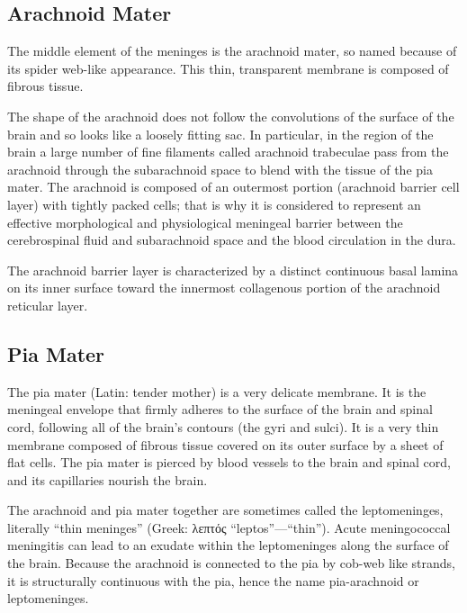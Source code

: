 \hypertarget{arachnoid-mater}{%
\subsection{Arachnoid Mater}\label{arachnoid-mater}}

The middle element of the meninges is the arachnoid mater, so named because of its spider web-like appearance. This thin, transparent membrane is composed of fibrous tissue.

The shape of the arachnoid does not follow the convolutions of the surface of the brain and so looks like a loosely fitting sac. In particular, in the region of the brain a large number of fine filaments called arachnoid trabeculae pass from the arachnoid through the subarachnoid space to blend with the tissue of the pia mater. The arachnoid is composed of an outermost portion (arachnoid barrier cell layer) with tightly packed cells; that is why it is considered to represent an effective morphological and physiological meningeal barrier between the cerebrospinal fluid and subarachnoid space and the blood circulation in the dura.

The arachnoid barrier layer is characterized by a distinct continuous basal lamina on its inner surface toward the innermost collagenous portion of the arachnoid reticular layer.

\hypertarget{pia-mater}{%
\subsection{Pia Mater}\label{pia-mater}}

The pia mater (Latin: tender mother) is a very delicate membrane. It is the meningeal envelope that firmly adheres to the surface of the brain and spinal cord, following all of the brain's contours (the gyri and sulci). It is a very thin membrane composed of fibrous tissue covered on its outer surface by a sheet of flat cells. The pia mater is pierced by blood vessels to the brain and spinal cord, and its capillaries nourish the brain.

The arachnoid and pia mater together are sometimes called the leptomeninges, literally ``thin meninges'' (Greek: λεπτός ``leptos''---``thin''). Acute meningococcal meningitis can lead to an exudate within the leptomeninges along the surface of the brain. Because the arachnoid is connected to the pia by cob-web like strands, it is structurally continuous with the pia, hence the name pia-arachnoid or leptomeninges.

